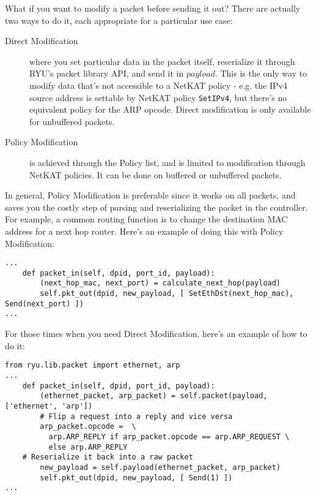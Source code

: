 What if you want to modify a packet before sending it out?  
There are actually two ways to do it, each appropriate for a particular use case:

\begin{description}
  \item[Direct Modification] where you set particular data in the packet itself, reserialize it through RYU's packet
  library API, and send it in $payload$.  
  This is the only way to modify data that's not accessible to a NetKAT policy - e.g. the IPv4 source address is
  settable by NetKAT policy \texttt{SetIPv4}, but there's no equivalent policy for the ARP opcode.  
  Direct modification is only available for unbuffered packets.
  \item[Policy Modification] is achieved through the Policy list, and is limited to modification through NetKAT
  policies.
  It can be done on buffered or unbuffered packets.
\end{description}

In general, Policy Modification is preferable since it works on all packets, and saves you the costly step of parsing and 
reserializing the packet in the controller.
For example, a common routing function is to change the destination MAC address for a next hop router.
Here's an example of doing this with Policy Modification:

\begin{lstlisting}
...
    def packet_in(self, dpid, port_id, payload):
        (next_hop_mac, next_port) = calculate_next_hop(payload)
        self.pkt_out(dpid, new_payload, [ SetEthDst(next_hop_mac), Send(next_port) ])	
...
\end{lstlisting}



For those times when you need Direct Modification, here's an example of how to do it:

\begin{lstlisting}
from ryu.lib.packet import ethernet, arp
...
    def packet_in(self, dpid, port_id, payload):
        (ethernet_packet, arp_packet) = self.packet(payload, ['ethernet', 'arp'])
        # Flip a request into a reply and vice versa
        arp_packet.opcode =  \ 
          arp.ARP_REPLY if arp_packet.opcode == arp.ARP_REQUEST \
          else arp.ARP_REPLY
	# Reserialize it back into a raw packet
        new_payload = self.payload(ethernet_packet, arp_packet)
        self.pkt_out(dpid, new_payload, [ Send(1) ])	
...
\end{lstlisting}

